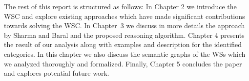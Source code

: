 The rest of this report is structured as follows:
In Chapter 2 we introduce the WSC and explore existing approaches which have made significant contributions towards solving the WSC. In Chapter~3 we discuss in more details the approach by Sharma and Baral \cite{2018CommonsenseKT} and the proposed reasoning algorithm.
Chapter 4 presents the result of our analysis along with examples and description for the identified categories. In this chapter we also discuss the semantic graphs of the WSs which we analyzed thoroughly and formalized. Finally, Chapter 5 concludes the paper and explores potential future work.


